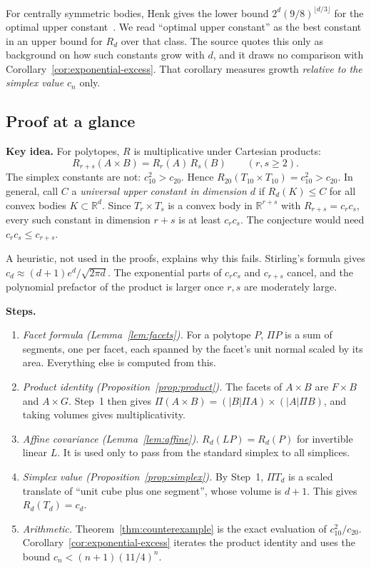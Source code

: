 \documentclass[11pt]{article}
\newcommand{\R}{\mathbb R}
\begin{document}
For centrally symmetric bodies, Henk gives the lower bound
\(2^d(9/8)^{\lfloor d/3\rfloor}\) for the optimal upper
constant~\cite{Henk}. We read ``optimal upper constant'' as the best
constant in an upper bound for \(R_d\) over that class. The source quotes
this only as background on how such constants grow with \(d\), and it draws
no comparison with Corollary~\ref{cor:exponential-excess}. That corollary
measures growth \emph{relative to the simplex value} \(c_n\) only.

\subsection{Proof at a glance}

\textbf{Key idea.} For polytopes, \(R\) is multiplicative under Cartesian
products:
\[
 R_{r+s}(A\times B)=R_r(A)\,R_s(B)\qquad(r,s\ge2).
\]
The simplex constants are not: \(c_{10}^2>c_{20}\). Hence
\(R_{20}(T_{10}\times T_{10})=c_{10}^2>c_{20}\). In general, call \(C\) a
\emph{universal upper constant in dimension \(d\)} if \(R_d(K)\le C\) for
all convex bodies \(K\subset\R^d\). Since \(T_r\times T_s\) is a convex
body in \(\R^{r+s}\) with \(R_{r+s}=c_rc_s\), every such constant in
dimension \(r+s\) is at least \(c_rc_s\). The conjecture would need
\(c_rc_s\le c_{r+s}\).

A heuristic, not used in the proofs, explains why this fails. Stirling's
formula gives \(c_d\approx(d+1)e^d/\sqrt{2\pi d}\). The exponential parts
of \(c_rc_s\) and \(c_{r+s}\) cancel, and the polynomial prefactor of the
product is larger once \(r,s\) are moderately large.

\textbf{Steps.}
\begin{enumerate}[leftmargin=2em,itemsep=2pt]
\item \emph{Facet formula (Lemma~\ref{lem:facets}).} For a polytope \(P\),
 \(\Pi P\) is a sum of segments, one per facet, each spanned by the facet's
 unit normal scaled by its area. Everything else is computed from this.
\item \emph{Product identity (Proposition~\ref{prop:product}).} The facets
 of \(A\times B\) are \(F\times B\) and \(A\times G\). Step~1 then gives
 \(\Pi(A\times B)=(|B|\Pi A)\times(|A|\Pi B)\), and taking volumes gives
 multiplicativity.
\item \emph{Affine covariance (Lemma~\ref{lem:affine}).}
 \(R_d(LP)=R_d(P)\) for invertible linear \(L\). It is used only to pass
 from the standard simplex to all simplices.
\item \emph{Simplex value (Proposition~\ref{prop:simplex}).} By Step~1,
 \(\Pi T_d\) is a scaled translate of ``unit cube plus one segment'', whose
 volume is \(d+1\). This gives \(R_d(T_d)=c_d\).
\item \emph{Arithmetic.} Theorem~\ref{thm:counterexample} is the exact
 evaluation of \(c_{10}^2/c_{20}\).
 Corollary~\ref{cor:exponential-excess} iterates the product identity and
 uses the bound \(c_n<(n+1)(11/4)^n\).
\end{enumerate}
\end{document}

